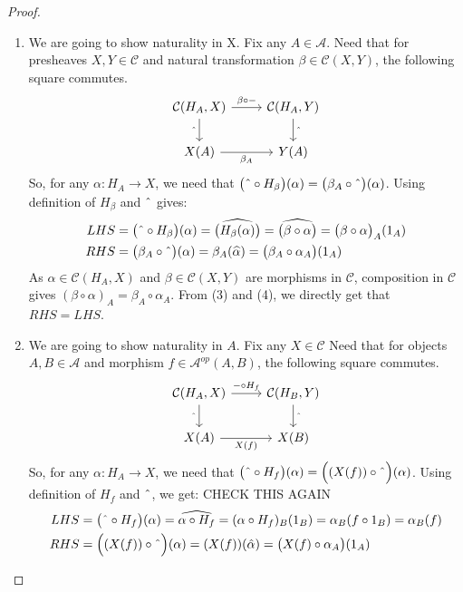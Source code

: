 \documentclass[18pt,a4paper]{article}
\theoremstyle{definition}
\begin{document}
\begin{proof}
\begin{enumerate}[label=(\roman*)]
	\item We are going to show naturality in X. Fix any $A \in \mathcal{A}$. Need that for
		presheaves $X,Y \in \mathcal{C}$ and
		natural transformation $\beta \in \mathcal{C} (X,Y)$, the following
		square commutes.
		\begin{equation*}
		\begin{tikzcd}
			\mathcal{C}(H_A,X) \arrow[swap]{d}{ \string ^}
			\arrow{r}{\beta \circ -}
			& \mathcal{C}(H_A,Y) \arrow{d}{\string ^}\\
			X(A) \arrow[swap]{r}{\beta_A}
			& Y(A)
		\end{tikzcd}
		\end{equation*}
		So, for any $\alpha:H_A \to X$, we need that
		$\big( \string ^ \circ H_\beta \big)(\alpha) = \big( \beta_A \circ \string ^
		\big)(\alpha)$. Using definition of $H_\beta$ and $\string ^$ gives:
		\begin{align}
			LHS & = \big( \string ^ \circ H_\beta \big)(\alpha) =
			\widehat{\big(  H_\beta(\alpha)\big)}=
			\widehat{\big(  \beta \circ \alpha\big)}
			=\big(  \beta \circ \alpha\big)_A(1_A) \\
			RHS & = \big( \beta_A \circ \string ^ \big)(\alpha)
			= \beta_A (\widehat{\alpha}) =\big( \beta_A \circ \alpha_A\big)(1_A)
		\end{align}
		As $\alpha \in \mathcal{C} (H_A,X)$ and $\beta \in \mathcal{C}(X,Y)$
		are morphisms in $\mathcal{C}$, composition in $\mathcal{C}$ gives
		$(\beta \circ \alpha)_A = \beta_A \circ \alpha_A$. From (3) and (4), we
		directly get that $RHS=LHS$.

	\item We are going to show naturality in $A$. Fix any $X \in \mathcal{C} $ Need that
		for objects $A,B \in \mathcal{A} $ and morphism $f\in \mathcal{A} ^{op}(A,B)$,
		the following square commutes.
		\begin{equation*}
		\begin{tikzcd}
			\mathcal{C}(H_A,X) \arrow[swap]{d}{ \string ^}
			\arrow{r}{- \circ H_f}
			& \mathcal{C}(H_B,Y) \arrow{d}{\string ^}\\
			X(A) \arrow[swap]{r}{X(f)}
			& X(B)
		\end{tikzcd}
		\end{equation*}
		So, for any $\alpha:H_A \to X$, we need that
	$\big( \string ^ \circ H_f \big)(\alpha)=\Big((X(f)) \circ \string ^ \Big)(\alpha) $.
	Using definition of $H_f$ and $\string ^$, we get:
	CHECK THIS AGAIN
	\begin{align}
		LHS&=\big( \string ^ \circ H_f \big)(\alpha)= \widehat{\alpha \circ H_f}
		=(\alpha \circ H_f)_B (1_B) = \alpha_B (f \circ 1_B) = \alpha_B(f) \\
		RHS&=\Big((X(f)) \circ \string ^ \Big)(\alpha)
		= (X(f))(\hat{\alpha})= \big(X(f) \circ \alpha_A\big)(1_A)
	\end{align}


\end{enumerate}



\end{proof}
\end{document}
